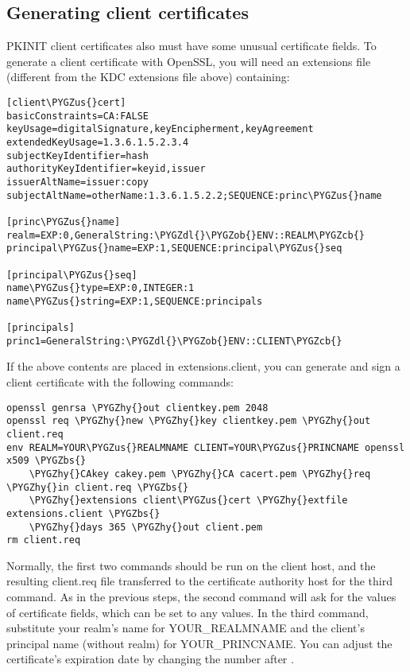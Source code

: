 \documentclass[letterpaper,10pt,english]{sphinxmanual}
\def\PYGZbs{\char`\\}
\def\PYGZus{\char`\_}
\def\PYGZob{\char`\{}
\def\PYGZcb{\char`\}}
\def\PYGZdl{\char`\$}
\def\PYGZhy{\char`\-}
\begin{document}
\subsection{Generating client certificates}
\label{admin/pkinit:generating-client-certificates}
PKINIT client certificates also must have some unusual certificate
fields.  To generate a client certificate with OpenSSL, you will need
an extensions file (different from the KDC extensions file above)
containing:

\begin{Verbatim}[commandchars=\\\{\}]
[client\PYGZus{}cert]
basicConstraints=CA:FALSE
keyUsage=digitalSignature,keyEncipherment,keyAgreement
extendedKeyUsage=1.3.6.1.5.2.3.4
subjectKeyIdentifier=hash
authorityKeyIdentifier=keyid,issuer
issuerAltName=issuer:copy
subjectAltName=otherName:1.3.6.1.5.2.2;SEQUENCE:princ\PYGZus{}name

[princ\PYGZus{}name]
realm=EXP:0,GeneralString:\PYGZdl{}\PYGZob{}ENV::REALM\PYGZcb{}
principal\PYGZus{}name=EXP:1,SEQUENCE:principal\PYGZus{}seq

[principal\PYGZus{}seq]
name\PYGZus{}type=EXP:0,INTEGER:1
name\PYGZus{}string=EXP:1,SEQUENCE:principals

[principals]
princ1=GeneralString:\PYGZdl{}\PYGZob{}ENV::CLIENT\PYGZcb{}
\end{Verbatim}

If the above contents are placed in extensions.client, you can
generate and sign a client certificate with the following commands:

\begin{Verbatim}[commandchars=\\\{\}]
openssl genrsa \PYGZhy{}out clientkey.pem 2048
openssl req \PYGZhy{}new \PYGZhy{}key clientkey.pem \PYGZhy{}out client.req
env REALM=YOUR\PYGZus{}REALMNAME CLIENT=YOUR\PYGZus{}PRINCNAME openssl x509 \PYGZbs{}
    \PYGZhy{}CAkey cakey.pem \PYGZhy{}CA cacert.pem \PYGZhy{}req \PYGZhy{}in client.req \PYGZbs{}
    \PYGZhy{}extensions client\PYGZus{}cert \PYGZhy{}extfile extensions.client \PYGZbs{}
    \PYGZhy{}days 365 \PYGZhy{}out client.pem
rm client.req
\end{Verbatim}

Normally, the first two commands should be run on the client host, and
the resulting client.req file transferred to the certificate authority
host for the third command.  As in the previous steps, the second
command will ask for the values of certificate fields, which can be
set to any values.  In the third command, substitute your realm's name
for YOUR\_REALMNAME and the client's principal name (without realm) for
YOUR\_PRINCNAME.  You can adjust the certificate's expiration date by
changing the number after .
\end{document}
